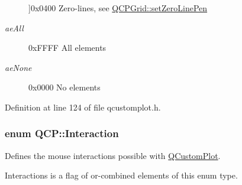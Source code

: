 \begin{Desc}
\begin{description}
{}]{\ttfamily 0x0400} Zero-\/lines, see \hyperlink{class_q_c_p_grid_a209f40fdb252397b418b82d3494d8ea0}{Q\-C\-P\-Grid\-::set\-Zero\-Line\-Pen} \item[{\em 
\hypertarget{namespace_q_c_p_ae55dbe315d41fe80f29ba88100843a0caa897c232a0ffc8368e7c100ffc59ef31}{ae\-All}\label{namespace_q_c_p_ae55dbe315d41fe80f29ba88100843a0caa897c232a0ffc8368e7c100ffc59ef31}
}]{\ttfamily 0x\-F\-F\-F\-F} All elements \item[{\em 
\hypertarget{namespace_q_c_p_ae55dbe315d41fe80f29ba88100843a0caa9e90d81896358757d94275aeaa58f6a}{ae\-None}\label{namespace_q_c_p_ae55dbe315d41fe80f29ba88100843a0caa9e90d81896358757d94275aeaa58f6a}
}]{\ttfamily 0x0000} No elements \end{description}
\end{Desc}


Definition at line 124 of file qcustomplot.\-h.

\hypertarget{namespace_q_c_p_a2ad6bb6281c7c2d593d4277b44c2b037}{
\subsubsection[{Interaction}]{\setlength{\rightskip}{0pt plus 5cm}enum {\bf Q\-C\-P\-::\-Interaction}}}\label{namespace_q_c_p_a2ad6bb6281c7c2d593d4277b44c2b037}
Defines the mouse interactions possible with \hyperlink{class_q_custom_plot}{Q\-Custom\-Plot}.

{\ttfamily Interactions} is a flag of or-\/combined elements of this enum type.

